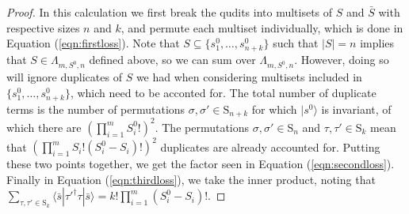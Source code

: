 \begin{proof}
In this calculation we first break the qudits into multisets of $S$ and $\bar{S}$ with respective sizes $n$ and $k$, and permute each multiset individually, which is done in Equation (\ref{eqn:firstloss}). 
Note that $S \subseteq \{s^0_{1},\dots,s^0_{n+k}\}$ such that $|S|=n$ implies that $S\in\Lambda_{m,S^0,n}$ defined above, so we can sum over $\Lambda_{m,S^0,n}$. 
However, doing so will ignore duplicates of $S$ we had when considering multisets included in $\{s^0_1,\dots,s^0_{n+k}\}$, which need to be acconted for. 
The total number of duplicate terms is the number of permutations $\sigma,\sigma'\in\textrm{S}_{n+k}$ for which $|s^0\rangle$ is invariant, of which there are $(\prod_{i=1}^m S^0_i!)^2$. 
The permutations $\sigma,\sigma'\in\textrm{S}_n$ and $\tau,\tau'\in\textrm{S}_k$ mean that $(\prod_{i=1}^mS_i!(S_i^0-S_i)!)^2$ duplicates are already accounted for. 
Putting these two points together, we get the factor seen in Equation (\ref{eqn:secondloss}). 
Finally in Equation (\ref{eqn:thirdloss}), we take the inner product, noting that $\sum_{\tau,\tau'\in\textrm{S}_k}\langle \bar{s}|\tau'^\dagger\tau|\bar{s}\rangle = k!\prod_{i=1}^m(S_i^0-S_i)!$.


\end{proof}
